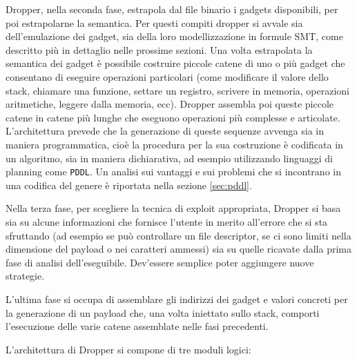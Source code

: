 Dropper, nella seconda fase, estrapola dal file binario i gadgets
disponibili, per poi estrapolarne la semantica. Per questi compiti
dropper si avvale sia dell'emulazione dei gadget, sia della loro
modellizzazione in formule SMT, come descritto più in dettaglio nelle
prossime sezioni. Una volta estrapolata la semantica dei gadget è
possibile costruire piccole catene di uno o più gadget che consentano
di eseguire operazioni particolari (come modificare il valore dello
stack, chiamare una funzione, settare un registro, scrivere in
memoria, operazioni aritmetiche, leggere dalla memoria, ecc). Dropper
assembla poi queste piccole catene in catene più lunghe che eseguono
operazioni più complesse e articolate. L'architettura prevede che la
generazione di queste sequenze avvenga sia in maniera programmatica,
cioè la procedura per la sua costruzione è codificata in un algoritmo,
sia in maniera dichiarativa, ad esempio utilizzando linguaggi di
planning come \lstinline{PDDL}\cite{pddl-97}. Un analisi sui vantaggi
e sui problemi che si incontrano in una codifica del genere è
riportata nella sezione \ref{sec:pddl}.

Nella terza fase, per scegliere la tecnica di exploit appropriata,
Dropper si basa sia su alcune informazioni che fornisce l'utente in
merito all'errore che si sta sfruttando (ad esempio se può controllare
un file descriptor, se ci sono limiti nella dimensione del payload o
nei caratteri ammessi) sia su quelle ricavate dalla prima fase di
analisi dell'eseguibile. Dev'essere semplice poter aggiungere nuove
strategie.

L'ultima fase si occupa di assemblare gli indirizzi dei gadget e
valori concreti per la generazione di un payload che, una volta
iniettato sullo stack, comporti l'esecuzione delle varie catene
assemblate nelle fasi precedenti.


L'architettura di Dropper si compone di tre moduli logici:


